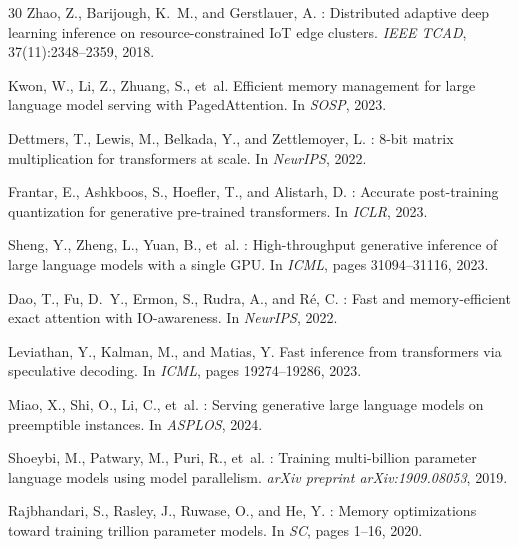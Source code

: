 \documentclass[11pt,a4paper]{article}
\begin{document}
\begin{thebibliography}{30}
Zhao, Z., Barijough, K.~M., and Gerstlauer, A.
: Distributed adaptive deep learning inference on resource-constrained {IoT} edge clusters.
\newblock \emph{IEEE TCAD}, 37(11):2348--2359, 2018.

Kwon, W., Li, Z., Zhuang, S., et~al.
\newblock Efficient memory management for large language model serving with {PagedAttention}.
\newblock In \emph{SOSP}, 2023.

Dettmers, T., Lewis, M., Belkada, Y., and Zettlemoyer, L.
: 8-bit matrix multiplication for transformers at scale.
\newblock In \emph{NeurIPS}, 2022.

Frantar, E., Ashkboos, S., Hoefler, T., and Alistarh, D.
: Accurate post-training quantization for generative pre-trained transformers.
\newblock In \emph{ICLR}, 2023.

Sheng, Y., Zheng, L., Yuan, B., et~al.
: High-throughput generative inference of large language models with a single {GPU}.
\newblock In \emph{ICML}, pages 31094--31116, 2023.

Dao, T., Fu, D.~Y., Ermon, S., Rudra, A., and R\'e, C.
: Fast and memory-efficient exact attention with {IO}-awareness.
\newblock In \emph{NeurIPS}, 2022.

Leviathan, Y., Kalman, M., and Matias, Y.
\newblock Fast inference from transformers via speculative decoding.
\newblock In \emph{ICML}, pages 19274--19286, 2023.

Miao, X., Shi, O., Li, C., et~al.
: Serving generative large language models on preemptible instances.
\newblock In \emph{ASPLOS}, 2024.

Shoeybi, M., Patwary, M., Puri, R., et~al.
: Training multi-billion parameter language models using model parallelism.
\newblock \emph{arXiv preprint arXiv:1909.08053}, 2019.

Rajbhandari, S., Rasley, J., Ruwase, O., and He, Y.
: Memory optimizations toward training trillion parameter models.
\newblock In \emph{SC}, pages 1--16, 2020.


\end{thebibliography}
\end{document}
